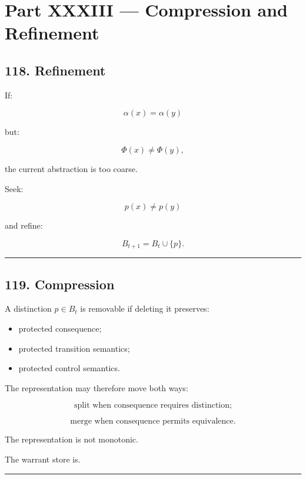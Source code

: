 \documentclass[
]{article}
\providecommand{\tightlist}{%
  \setlength{\itemsep}{0pt}\setlength{\parskip}{0pt}}
\begin{document}
\section{Part XXXIII --- Compression and
Refinement}\label{part-xxxiii-compression-and-refinement}

\subsection{118. Refinement}\label{refinement}

If:

\[
\alpha(x)=\alpha(y)
\]

but:

\[
\Phi(x)\neq\Phi(y),
\]

the current abstraction is too coarse.

Seek:

\[
p(x)\neq p(y)
\]

and refine:

\[
B_{t+1}=B_t\cup\{p\}.
\]

\begin{center}\rule{0.5\linewidth}{0.5pt}\end{center}

\subsection{119. Compression}\label{compression}

A distinction \(p\in B_t\) is removable if deleting it preserves:

\begin{itemize}
\tightlist
\item
  protected consequence;
\item
  protected transition semantics;
\item
  protected control semantics.
\end{itemize}

The representation may therefore move both ways:

\[
\boxed{
\text{split when consequence requires distinction;}
}
\]

\[
\boxed{
\text{merge when consequence permits equivalence.}
}
\]

The representation is not monotonic.

The warrant store is.

\begin{center}\rule{0.5\linewidth}{0.5pt}\end{center}
\end{document}
